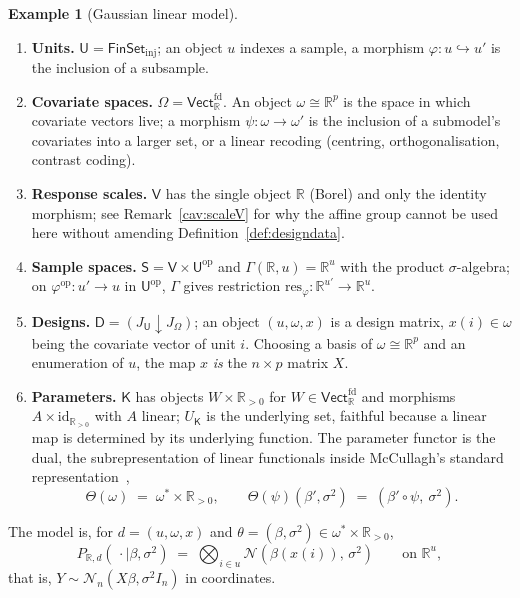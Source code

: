 \documentclass[11pt,a4paper]{article}
\theoremstyle{plain}
\theoremstyle{definition}
\newtheorem{example}[theorem]{Example}
\theoremstyle{remark}
\newcommand{\cat}[1]{\mathsf{#1}}
\newcommand{\catU}{\cat{U}}
\newcommand{\catV}{\cat{V}}
\newcommand{\catO}{\cat{\Omega}}
\newcommand{\catS}{\cat{S}}
\newcommand{\catD}{\cat{D}}
\newcommand{\catK}{\cat{K}}
\newcommand{\FinSet}{\cat{FinSet}}
\newcommand{\op}{\mathrm{op}}
\newcommand{\id}{\mathrm{id}}
\newcommand{\R}{\mathbb{R}}
\newcommand{\Vect}{\cat{Vect}}
\newcommand{\Norm}{\mathcal{N}}
\newcommand{\res}{\mathrm{res}}
\begin{document}
\begin{example}[Gaussian linear model]\label{ex:linreg}
\leavevmode
\begin{enumerate}
\item \textbf{Units.} $\catU = \FinSet_{\mathrm{inj}}$; an object $u$ indexes
a sample, a morphism $\varphi \colon u \hookrightarrow u'$ is the inclusion of
a subsample.

\item \textbf{Covariate spaces.} $\catO = \Vect_{\R}^{\mathrm{fd}}$. An object
$\omega \cong \R^{p}$ is the space in which covariate vectors live; a morphism
$\psi \colon \omega \to \omega'$ is the inclusion of a submodel's covariates
into a larger set, or a linear recoding (centring, orthogonalisation, contrast
coding).

\item \textbf{Response scales.} $\catV$ has the single object $\R$ (Borel) and
only the identity morphism; see Remark~\ref{cav:scaleV} for why the affine
group cannot be used here without amending Definition~\ref{def:designdata}.

\item \textbf{Sample spaces.} $\catS = \catV\times\catU^{\op}$ and
$\Gamma(\R,u) = \R^{u}$ with the product $\sigma$-algebra; on
$\varphi^{\op}\colon u' \to u$ in $\catU^{\op}$, $\Gamma$ gives restriction
$\res_\varphi \colon \R^{u'} \to \R^{u}$.

\item \textbf{Designs.} $\catD = (J_{\catU}\downarrow J_{\catO})$; an object
$(u,\omega,x)$ is a design matrix, $x(i) \in \omega$ being the covariate
vector of unit $i$. Choosing a basis of $\omega\cong\R^{p}$ and an enumeration
of $u$, the map $x$ \emph{is} the $n\times p$ matrix $X$.

\item \textbf{Parameters.} $\catK$ has objects $W\times\R_{>0}$ for
$W \in \Vect_{\R}^{\mathrm{fd}}$ and morphisms $A\times\id_{\R_{>0}}$ with $A$
linear; $U_{\catK}$ is the underlying set, faithful because a linear map is
determined by its underlying function. The parameter functor is the dual, the
subrepresentation of linear functionals inside McCullagh's standard
representation~\cite[\S4.2, p.~1235]{mccullagh_what_2002},
\[
\Theta(\omega) \;=\; \omega^{*}\times\R_{>0},
\qquad
\Theta(\psi)(\beta',\sigma^{2}) \;=\; (\beta'\circ\psi,\ \sigma^{2}) .
\]
\end{enumerate}

\noindent The model is, for $d=(u,\omega,x)$ and
$\theta = (\beta,\sigma^{2}) \in \omega^{*}\times\R_{>0}$,
\[
P_{\R,d}(\,\cdot \mid \beta,\sigma^{2})
\;=\; \bigotimes_{i\in u} \Norm(\beta(x(i)),\,\sigma^{2})
\qquad\text{on } \R^{u},
\]
that is, $Y \sim \Norm_{n}(X\beta,\sigma^{2}I_{n})$ in coordinates.
\end{example}
\end{document}
